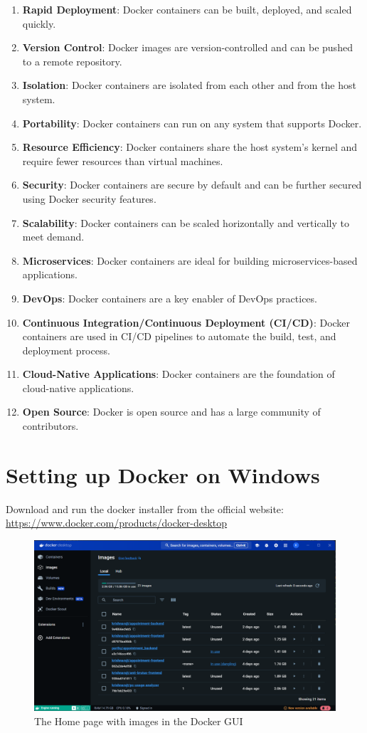 \documentclass[11pt]{article}
\begin{document}
\begin{enumerate}
    \item \textbf{Rapid Deployment}: Docker containers can be built, deployed, and scaled quickly.
    \item \textbf{Version Control}: Docker images are version-controlled and can be pushed to a remote repository.
    \item \textbf{Isolation}: Docker containers are isolated from each other and from the host system.
    \item \textbf{Portability}: Docker containers can run on any system that supports Docker.
    \item \textbf{Resource Efficiency}: Docker containers share the host system's kernel and require fewer resources than virtual machines.
    \item \textbf{Security}: Docker containers are secure by default and can be further secured using Docker security features.
    \item \textbf{Scalability}: Docker containers can be scaled horizontally and vertically to meet demand.
    \item \textbf{Microservices}: Docker containers are ideal for building microservices-based applications.
    \item \textbf{DevOps}: Docker containers are a key enabler of DevOps practices.
    \item \textbf{Continuous Integration/Continuous Deployment (CI/CD)}: Docker containers are used in CI/CD pipelines to automate the build, test, and deployment process.
    \item \textbf{Cloud-Native Applications}: Docker containers are the foundation of cloud-native applications.
    \item \textbf{Open Source}: Docker is open source and has a large community of contributors.
\end{enumerate}

\section{Setting up Docker on Windows}

Download and run the docker installer from the official website: \url{https://www.docker.com/products/docker-desktop}

\begin{figure}[H]
    \centering
    \includegraphics[width=.95\textwidth]{docker images gui.png}
    \caption{The Home page with images in the Docker GUI}
\end{figure}
\end{document}
